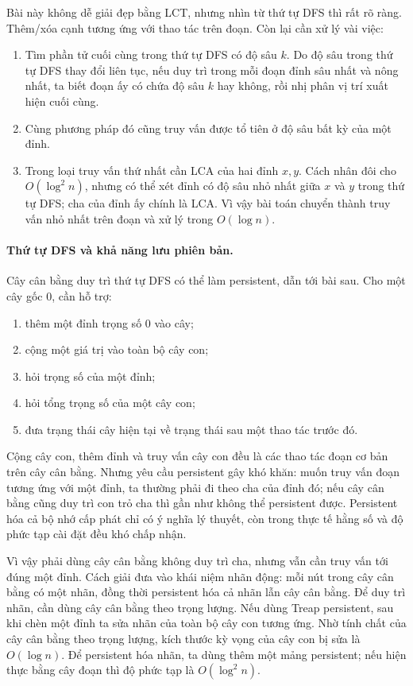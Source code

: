 \documentclass[11pt]{article}
\begin{document}
Bài này không dễ giải đẹp bằng LCT, nhưng nhìn từ thứ tự DFS thì rất rõ ràng.
Thêm/xóa cạnh tương ứng với thao tác trên đoạn. Còn lại cần xử lý vài việc:
\begin{enumerate}
  \item Tìm phần tử cuối cùng trong thứ tự DFS có độ sâu \(k\). Do độ sâu trong
  thứ tự DFS thay đổi liên tục, nếu duy trì trong mỗi đoạn đỉnh sâu nhất và nông
  nhất, ta biết đoạn ấy có chứa độ sâu \(k\) hay không, rồi nhị phân vị trí xuất
  hiện cuối cùng.
  \item Cùng phương pháp đó cũng truy vấn được tổ tiên ở độ sâu bất kỳ của một
  đỉnh.
  \item Trong loại truy vấn thứ nhất cần LCA của hai đỉnh \(x,y\). Cách nhân đôi
  cho \(O(\log^2 n)\), nhưng có thể xét đỉnh có độ sâu nhỏ nhất giữa \(x\) và
  \(y\) trong thứ tự DFS; cha của đỉnh ấy chính là LCA. Vì vậy bài toán chuyển
  thành truy vấn nhỏ nhất trên đoạn và xử lý trong \(O(\log n)\).
\end{enumerate}

\paragraph{Thứ tự DFS và khả năng lưu phiên bản.}
Cây cân bằng duy trì thứ tự DFS có thể làm persistent, dẫn tới bài sau. Cho một
cây gốc \(0\), cần hỗ trợ:
\begin{enumerate}
  \item thêm một đỉnh trọng số \(0\) vào cây;
  \item cộng một giá trị vào toàn bộ cây con;
  \item hỏi trọng số của một đỉnh;
  \item hỏi tổng trọng số của một cây con;
  \item đưa trạng thái cây hiện tại về trạng thái sau một thao tác trước đó.
\end{enumerate}

Cộng cây con, thêm đỉnh và truy vấn cây con đều là các thao tác đoạn cơ bản trên
cây cân bằng. Nhưng yêu cầu persistent gây khó khăn: muốn truy vấn đoạn tương
ứng với một đỉnh, ta thường phải đi theo cha của đỉnh đó; nếu cây cân bằng cũng
duy trì con trỏ cha thì gần như không thể persistent được. Persistent hóa cả bộ
nhớ cấp phát chỉ có ý nghĩa lý thuyết, còn trong thực tế hằng số và độ phức tạp
cài đặt đều khó chấp nhận.

Vì vậy phải dùng cây cân bằng không duy trì cha, nhưng vẫn cần truy vấn tới đúng
một đỉnh. Cách giải đưa vào khái niệm nhãn động: mỗi nút trong cây cân bằng có
một nhãn, đồng thời persistent hóa cả nhãn lẫn cây cân bằng. Để duy trì nhãn,
cần dùng cây cân bằng theo trọng lượng. Nếu dùng Treap persistent, sau khi chèn
một đỉnh ta sửa nhãn của toàn bộ cây con tương ứng. Nhờ tính chất của cây cân
bằng theo trọng lượng, kích thước kỳ vọng của cây con bị sửa là \(O(\log n)\).
Để persistent hóa nhãn, ta dùng thêm một mảng persistent; nếu hiện thực bằng cây
đoạn thì độ phức tạp là \(O(\log^2 n)\).
\end{document}
